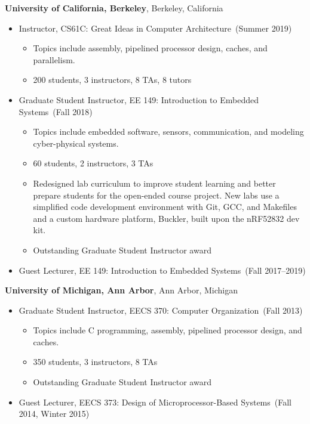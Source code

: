 \documentclass{article}
\begin{document}
{\bf University of California, Berkeley}, Berkeley, California
\vspace{-6pt}
\begin{itemize}
  \item[] Instructor, CS61C: Great Ideas in Computer Architecture~(Summer 2019)
    \vspace{-\topsep}
    \vspace{\itemsep}
    \begin{itemize}
      \item Topics include assembly, pipelined processor design, caches, and parallelism.
      \item 200 students, 3 instructors, 8 TAs, 8 tutors
    \end{itemize}
  \item[] Graduate Student Instructor, EE 149: Introduction to Embedded Systems~(Fall 2018)
    \vspace{-\topsep}
    \vspace{\itemsep}
    \begin{itemize}
      \item Topics include embedded software, sensors, communication, and modeling cyber-physical systems.
      \item 60 students, 2 instructors, 3 TAs
      \item Redesigned lab curriculum to improve student learning and better
        prepare students for the open-ended course project. New labs use a
        simplified code development environment  with Git, GCC, and Makefiles
        and a custom hardware platform, Buckler, built upon the nRF52832 dev
        kit.
      \item Outstanding Graduate Student Instructor award
    \end{itemize}
  \item[] Guest Lecturer, EE 149: Introduction to Embedded Systems~(Fall 2017--2019)
\end{itemize}

{\bf University of Michigan, Ann Arbor}, Ann Arbor, Michigan
\vspace{-6pt}
\begin{itemize}
  \item[] Graduate Student Instructor, EECS 370: Computer Organization~(Fall 2013)
    \vspace{-\topsep}
    \vspace{\itemsep}
    \begin{itemize}
      \item Topics include C programming, assembly, pipelined processor design, and  caches.
      \item 350 students, 3 instructors, 8 TAs
      \item Outstanding Graduate Student Instructor award
    \end{itemize}
  \item[] Guest Lecturer, EECS 373: Design of Microprocessor-Based Systems~(Fall 2014, Winter 2015)
\end{itemize}
\end{document}
